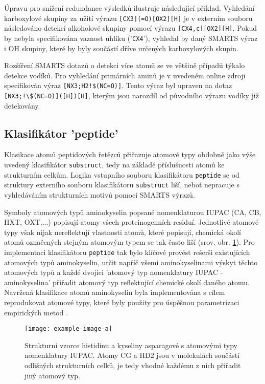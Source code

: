 Úpravu pro snížení redundance výsledků ilustruje následující příklad. Vyhledání karboxylové skupiny za užití výrazu \verb|[CX3](=O)[OX2][H]| je v externím souboru následováno detekcí alkoholové skupiny pomocí výrazu \verb|[CX4,c][OX2][H]|. Pokud by nebyla specifikována vaznost uhlíku ('\verb|CX4|'), vyhledal by daný SMARTS výraz i OH skupiny, které by byly součástí dříve určených karboxylových skupin. 

Rozšíření SMARTS dotazů o detekci více atomů se ve většině případů týkalo detekce vodíků. Pro vyhledání primárních aminů je v uvedeném online zdroji specifikován výraz \verb|[NX3;H2!$(NC=O)]|. Tento výraz byl upraven
na dotaz \verb|[NX3;!\$(NC=O)]([H])[H]|, kterým jsou narozdíl od původního výrazu vodíky již detekovány.
 
\subsection{Klasifikátor 'peptide'}
Klasikace atomů peptidových řetězců přiřazuje atomové typy obdobně jako výše uvedený klasifikátor \verb|substruct|, tedy na základě příslušnosti atomů ke strukturním celkům. Logika vstupního souboru klasifikátoru \verb|peptide| se od struktury externího souboru klasifikátoru \verb|substruct| liší, neboť nepracuje s vyhledáváním strukturních motivů pomocí SMARTS výrazů. 

Symboly atomových typů aminokyselin popsané nomenklaturou IUPAC (CA, CB, HXT, OXT,...) popisují atomy všech proteinogenních residuí. Jednotlivé atomové typy však nijak nereflektují vlastnosti atomů, které popisují, chemická okolí ato\-mů označených stejným atomovým typem se tak často liší (srov. obr. \ref{aa_different_atom_types}). Pro implementaci klasifikátoru \verb|peptide| tak bylo klíčové provést rešerši existujících atomových typů aminokyselin, určit napříč všemi aminokyselinami výskyt těchto atomových typů a každé dvojici 'atomový typ  nomenklatury IUPAC - aminokyselina' přiřadit atomový typ reflektující chemické okolí daného atomu. Navržená klasifikace atomů aminokyselin byla implementována s cílem reprodukovat atomové typy, které byly použity pro úspěšnou parametrizaci empirických metod \cite{GDAC, attyp_peptides}.

\begin{figure}[h]
\label{aa_different_atom_types}
\begin{center}
\texttt{[image: example-image-a]}
\caption{Strukturní vzorce histidinu a kyseliny asparagové s atomovými typy nomenklatury IUPAC. Atomy CG a HD2 jsou v molekulách součástí odlišných strukturních celků, je tedy vhodné každému z nich přiřadit jiný atomový typ.}
\end{center}
\end{figure}




 



